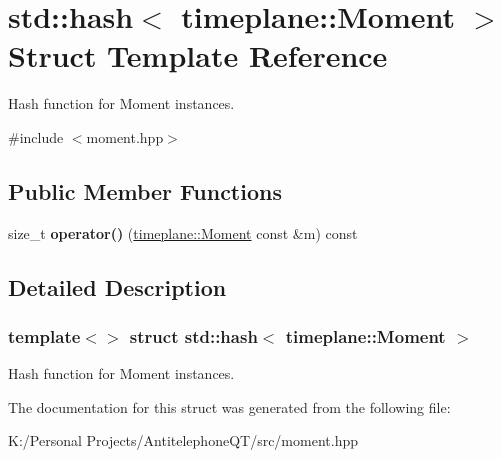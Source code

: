\hypertarget{structstd_1_1hash_3_01timeplane_1_1_moment_01_4}{}\section{std\+:\+:hash$<$ timeplane\+:\+:Moment $>$ Struct Template Reference}
\label{structstd_1_1hash_3_01timeplane_1_1_moment_01_4}


Hash function for {\ttfamily Moment} instances.  




{\ttfamily \#include $<$moment.\+hpp$>$}

\subsection*{Public Member Functions}
\begin{DoxyCompactItemize}
\item 
\mbox{\label{structstd_1_1hash_3_01timeplane_1_1_moment_01_4_a76126446c4b07982537785edc8f25181}} 
size\+\_\+t {\bfseries operator()} (\hyperlink{classtimeplane_1_1_moment}{timeplane\+::\+Moment} const \&m) const
\end{DoxyCompactItemize}


\subsection{Detailed Description}
\subsubsection*{template$<$$>$\newline
struct std\+::hash$<$ timeplane\+::\+Moment $>$}

Hash function for {\ttfamily Moment} instances. 

The documentation for this struct was generated from the following file\+:\begin{DoxyCompactItemize}
\item 
K\+:/\+Personal Projects/\+Antitelephone\+Q\+T/src/moment.\+hpp\end{DoxyCompactItemize}
